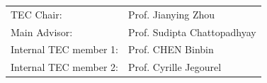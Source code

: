 \documentclass[
11pt, %
oneside, %
english, %
singlespacing, %
parskip, %
headsepline, %
]{MastersDoctoralThesis} %
\theoremstyle{definition}
\newcommand{\0}{{0_\TheCategoryOfSets}}
\newcommand{\1}{{1_\TheCategoryOfSets}}
\begin{document}

\begin{tec}
\addchaptertocentry{\tecname}
\begin{tabular}{ll}
	TEC Chair: & Prof. Jianying Zhou \\
	Main Advisor: & Prof. Sudipta Chattopadhyay \\
	Internal TEC member 1: & Prof. CHEN Binbin\\
	Internal TEC member 2: & Prof. Cyrille Jegourel \\
\end{tabular}
\end{tec}
\vfill\eject

 
\end{document}
